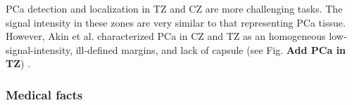 PCa detection and localization in TZ and CZ are more challenging tasks. The signal intensity in these zones are very similar to that representing PCa tissue. However, Akin et al. characterized PCa in CZ and TZ as an homogeneous low-signal-intensity, ill-defined margins, and lack of capsule (see Fig. \textbf{Add PCa in TZ}) \cite{Akin2006}.

\subsubsection{Medical facts}



%
%
%
%
